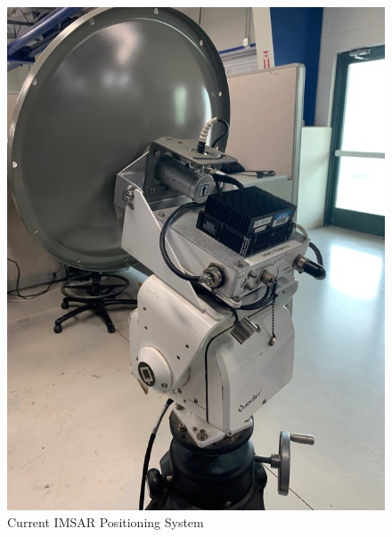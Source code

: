 {
\begin{figure}[H]
\begin{center}

\captionsetup{justification=centering,margin=2cm}
\includegraphics[angle=-90]{Images/IMSAR_PositioningSystem.jpg}
\caption{Current IMSAR Positioning System}
\end{center}
\end{figure}
}
